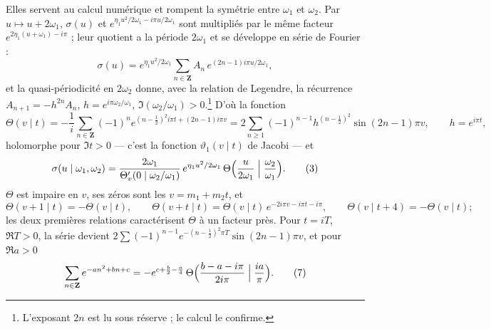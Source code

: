 \documentclass[11pt,a4paper]{article}
\begin{document}
Elles servent au calcul numérique
et rompent la symétrie entre $\omega_1$ et $\omega_2$. Par $u \mapsto u +
2\omega_1$, $\sigma(u)$ et $e^{\eta_1u^2/2\omega_1 - i\pi u/2\omega_1}$ sont
multipliés par le même facteur $e^{2\eta_1(u + \omega_1) - i\pi}$ ; leur quotient
a la période $2\omega_1$ et se développe en série de Fourier :
\[
\sigma(u) = e^{\eta_1u^2/2\omega_1}\sum_{n \in \mathbf{Z}} A_n\,e^{(2n-1)i\pi
u/2\omega_1},
\]
et la quasi-périodicité en $2\omega_2$ donne, avec la relation de Legendre, la
récurrence $A_{n+1} = -h^{2n}A_n$, $h = e^{i\pi\omega_2/\omega_1}$,
$\Im(\omega_2/\omega_1) > 0$.\footnote{L'exposant $2n$ est lu sous réserve ; le
calcul le confirme.} D'où la fonction
\[
\Theta(v \mid t) = -\frac1i\sum_{n \in \mathbf{Z}}(-1)^n e^{(n - \frac12)^2
i\pi t + (2n-1)i\pi v} = 2\sum_{n \geqslant 1}(-1)^{n-1}h^{(n - \frac12)^2}\sin(2n-1)\pi v,
\qquad h = e^{i\pi t}, \tag{1--2, 6}
\]
holomorphe pour $\Im t > 0$ --- c'est la fonction $\vartheta_1(v \mid t)$ de
Jacobi --- et
\[
\sigma(u \mid \omega_1, \omega_2) = \frac{2\omega_1}{\Theta_v'(0 \mid
\omega_2/\omega_1)}\,e^{\eta_1u^2/2\omega_1}\,\Theta\Bigl(\frac{u}{2\omega_1}
\Bigm| \frac{\omega_2}{\omega_1}\Bigr) . \tag{3}
\]
$\Theta$ est impaire en $v$, ses zéros sont les $v = m_1 + m_2t$, et
\[
\Theta(v + 1 \mid t) = -\Theta(v \mid t), \qquad \Theta(v + t \mid t) =
\Theta(v \mid t)\,e^{-2i\pi v - i\pi t - i\pi}, \qquad \Theta(v \mid t + 4) =
-\Theta(v \mid t) ; \tag{4--5}
\]
les deux premières relations caractérisent $\Theta$ à un facteur près. Pour $t
= iT$, $\Re T > 0$, la série devient $2\sum(-1)^{n-1}e^{-(n - \frac12)^2\pi
T}\sin(2n-1)\pi v$, et pour $\Re a > 0$
\[
\sum_{n \in \mathbf{Z}} e^{-an^2 + bn + c} = -e^{c + \frac b2 - \frac
a4}\,\Theta\Bigl(\frac{b - a - i\pi}{2i\pi} \Bigm| \frac{ia}{\pi}\Bigr) . \tag{7}
\]
\end{document}
